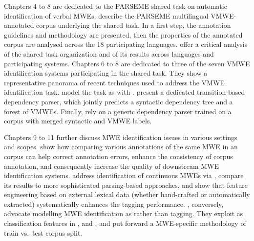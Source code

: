 \documentclass[output=paper,modfonts,]{langscibook}
\begin{document}
\newpage 
Chapters 4 %
to 8 %
are dedicated to the PARSEME shared task on automatic identification of verbal MWEs.  describe %
the PARSEME multilingual VMWE-annotated corpus underlying the shared task. In a first step, the annotation guidelines and methodology are presented, then 
the properties of the annotated corpus are analysed across the 18 participating languages.  offer a critical analysis of the shared task organization and of its results across languages and participating systems. Chapters 6 to 8 %
are dedicated to three of the seven %
VMWE identification systems participating in the shared task. They show a representative panorama of recent techniques used to address the VMWE identification task.   model the task as  with .
 present a dedicated transition-based dependency parser, which jointly predicts a syntactic dependency tree and a forest of VMWEs. 
Finally, 
  rely on a generic dependency parser trained on a corpus with merged syntactic and VMWE labels.

Chapters 9 %
to 11 %
further discuss MWE identification issues in various settings and scopes.  show how comparing various annotations of the same MWE in an  corpus can help correct annotation errors, enhance the consistency of corpus annotation, and consequently increase the quality of downstream MWE identification systems.  address identification of  continuous MWEs via , compare its results to more sophisticated parsing-based approaches, and show that feature engineering based on external lexical data (whether hand-crafted or automatically extracted) systematically enhances the tagging performance. , conversely, advocate 
modelling MWE identification as  rather than tagging. They exploit  as classification features in ,  and , and put forward a MWE-specific methodology of train vs.~test corpus split.
\end{document}
